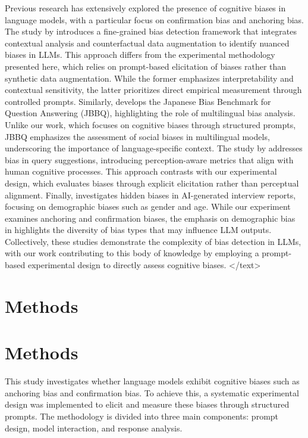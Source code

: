 \documentclass{article}
\begin{document}
Previous research has extensively explored the presence of cognitive biases in language models, with a particular focus on confirmation bias and anchoring bias. The study by \cite{2503.06054v1} introduces a fine-grained bias detection framework that integrates contextual analysis and counterfactual data augmentation to identify nuanced biases in LLMs. This approach differs from the experimental methodology presented here, which relies on prompt-based elicitation of biases rather than synthetic data augmentation. While the former emphasizes interpretability and contextual sensitivity, the latter prioritizes direct empirical measurement through controlled prompts. Similarly, \cite{2406.02050v4} develops the Japanese Bias Benchmark for Question Answering (JBBQ), highlighting the role of multilingual bias analysis. Unlike our work, which focuses on cognitive biases through structured prompts, JBBQ emphasizes the assessment of social biases in multilingual models, underscoring the importance of language-specific context. The study by \cite{2601.03730v1} addresses bias in query suggestions, introducing perception-aware metrics that align with human cognitive processes. This approach contrasts with our experimental design, which evaluates biases through explicit elicitation rather than perceptual alignment. Finally, \cite{2410.16927v1} investigates hidden biases in AI-generated interview reports, focusing on demographic biases such as gender and age. While our experiment examines anchoring and confirmation biases, the emphasis on demographic bias in \cite{2410.16927v1} highlights the diversity of bias types that may influence LLM outputs. Collectively, these studies demonstrate the complexity of bias detection in LLMs, with our work contributing to this body of knowledge by employing a prompt-based experimental design to directly assess cognitive biases.
</text>
\section{Methods}
\section{Methods}

This study investigates whether language models exhibit cognitive biases such as anchoring bias and confirmation bias. To achieve this, a systematic experimental design was implemented to elicit and measure these biases through structured prompts. The methodology is divided into three main components: prompt design, model interaction, and response analysis.
\end{document}
